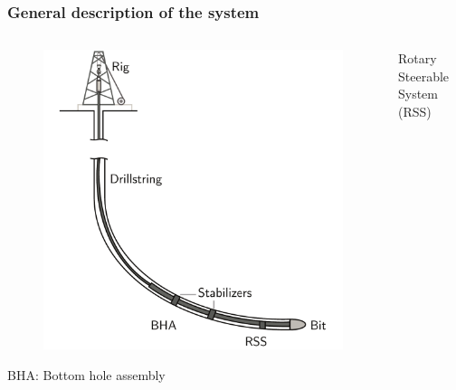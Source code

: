 \documentclass{beamer}
\begin{document}
\begin{frame}\frametitle{General description of the system}
	\begin{columns}
	\hspace{1cm}	\begin{column}{0.6\textwidth}
		\begin{figure}[ht]\centering
				\includegraphics[width=1\textwidth]{images/drillingsystem.pdf}
			\end{figure}
			BHA: Bottom hole assembly
		\end{column}
		\begin{column}{0.4\textwidth}
			\centering
			Rotary Steerable System (RSS)
			\vspace{-10pt}	
			\begin{figure}[ht]
				\begin{minipage}[t]{1\textwidth}

\end{minipage}
\end{figure}
\end{column}
\end{columns}
\end{frame}
\end{document}
